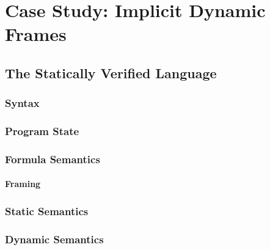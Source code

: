 \chapter{Case Study: Implicit Dynamic Frames}
\label{ch:case-study--implicit}


\section{The Statically Verified Language \svlidf}
\label{sec:language}


    \subsection{Syntax}
    \label{sec:syntax}
    
    
    \subsection{Program State}
    \label{ssec:program-state}
    
        
    \subsection{Formula Semantics}
    \label{ssec:formula-semantics}
    
    
        \subsubsection{Framing}
        \label{sssec:framing}
        
        
    
    \subsection{Static Semantics}
    \label{sec:static-semantics}
    
    
    \subsection{Dynamic Semantics}
    \label{ssec:dynamic-semantics}
    
    
